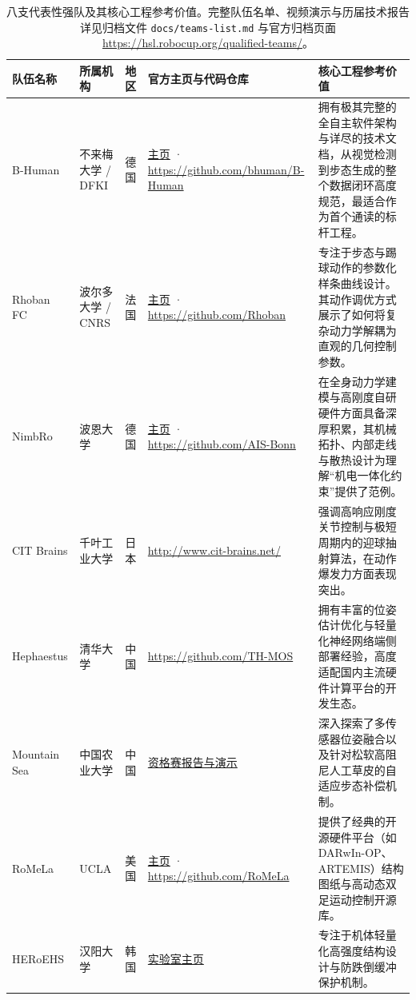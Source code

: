 \begin{table}[H]
\centering
\footnotesize
\begin{tabularx}{\textwidth}{p{1.8cm} p{2.6cm} p{1.0cm} p{3.2cm} X}
\toprule
\textbf{队伍名称} & \textbf{所属机构} & \textbf{地区} & \textbf{官方主页与代码仓库} & \textbf{核心工程参考价值} \\
\midrule
B-Human & 不来梅大学 / DFKI & 德国 & \href{https://www.b-human.de/}{主页} · \url{https://github.com/bhuman/B-Human} & 拥有极其完整的全自主软件架构与详尽的技术文档，从视觉检测到步态生成的整个数据闭环高度规范，最适合作为首个通读的标杆工程。 \\
\addlinespace
Rhoban FC & 波尔多大学 / CNRS & 法国 & \href{https://rhoban.com/}{主页} · \url{https://github.com/Rhoban} & 专注于步态与踢球动作的参数化样条曲线设计。其动作调优方式展示了如何将复杂动力学解耦为直观的几何控制参数。 \\
\addlinespace
NimbRo & 波恩大学 & 德国 & \href{https://ais.uni-bonn.de/nimbro/}{主页} · \url{https://github.com/AIS-Bonn} & 在全身动力学建模与高刚度自研硬件方面具备深厚积累，其机械拓扑、内部走线与散热设计为理解“机电一体化约束”提供了范例。 \\
\addlinespace
CIT Brains & 千叶工业大学 & 日本 & \url{http://www.cit-brains.net/} & 强调高响应刚度关节控制与极短周期内的迎球抽射算法，在动作爆发力方面表现突出。 \\
\addlinespace
Hephaestus & 清华大学 & 中国 & \url{https://github.com/TH-MOS} & 拥有丰富的位姿估计优化与轻量化神经网络端侧部署经验，高度适配国内主流硬件计算平台的开发生态。 \\
\addlinespace
Mountain Sea & 中国农业大学 & 中国 & \href{https://hsl.robocup.org/qualified-teams/}{资格赛报告与演示} & 深入探索了多传感器位姿融合以及针对松软高阻尼人工草皮的自适应步态补偿机制。 \\
\addlinespace
RoMeLa & UCLA & 美国 & \href{https://www.romela.org/}{主页} · \url{https://github.com/RoMeLa} & 提供了经典的开源硬件平台（如 DARwIn-OP、ARTEMIS）结构图纸与高动态双足运动控制开源库。 \\
\addlinespace
HERoEHS & 汉阳大学 & 韩国 & \href{https://heroehs.hanyang.ac.kr/}{实验室主页} & 专注于机体轻量化高强度结构设计与防跌倒缓冲保护机制。 \\
\bottomrule
\end{tabularx}
\caption{八支代表性强队及其核心工程参考价值。完整队伍名单、视频演示与历届技术报告详见归档文件 \texttt{docs/teams-list.md} 与官方归档页面 \url{https://hsl.robocup.org/qualified-teams/}。}
\end{table}

